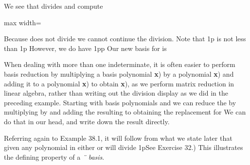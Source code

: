 \documentclass[11pt,oneside]{article}
\begin{document}
\BookNarrativetrue

\begin{BookBody}

 We see that  divides  and compute

\begin{center}\begin{adjustbox}{max width=\linewidth}\end{adjustbox}\end{center}

\noindent Because  does not divide  we cannot continue the division. Note that 1p is not less than 1p However, we do have 1pp Our new basis for  is \BookEnd{\blacktriangle}

When dealing with more than one indeterminate, it is often easier to perform basis reduction by multiplying a basis polynomial \textbf{x}) by a polynomial \textbf{x}) and adding it to a polynomial \textbf{x}) to obtain \textbf{x}), as we perform matrix reduction in linear algebra, rather than writing out the division display as we did in the preceding example. Starting with basis polynomials  and  we can reduce the  by multiplying  by  and adding the resulting  to  obtaining the replacement  for  We can do that in our head, and write down the result directly.

Referring again to Example 38.1, it will follow from what we state later that given any polynomial  in  either  or  will divide 1pSee Exercise 32.) This illustrates the defining property of a \textit{¨} \textit{basis}.


\end{BookBody}
\end{document}
